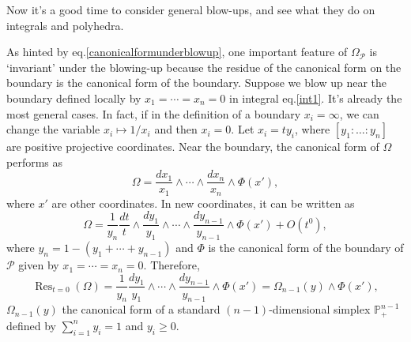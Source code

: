 \documentclass[12pt]{article}
\theoremstyle{definition}
\theoremstyle{plain}
\begin{document}
Now it's a good time to consider general blow-ups, and see what they do on integrals and polyhedra.

As hinted by eq.\eqref{canonicalformunderblowup}, one important feature of $\Omega_{\mathcal P}$
is `invariant' under the blowing-up because the residue of the canonical form on the boundary is
the canonical form of the boundary.
Suppose we blow up near the boundary defined locally by $x_1=\cdots=x_n=0$ in integral eq.\eqref{int1}. 
It's already the most general cases. In fact, if in the definition of a boundary $x_i=\infty$, we can
change the variable $x_i\mapsto 1/x_i$ and then $x_i=0$.
Let $x_i=ty_i$, where $[y_1:\dots:y_n]$ are positive projective coordinates. 
Near the boundary, the canonical form of $\Omega$ performs as 
\[
	\Omega=\frac{dx_1}{x_1}\wedge \cdots\wedge\frac{dx_n}{x_n}
	\wedge \Phi(x'),
\]
where $x'$ are other coordinates. In new coordinates, it can be written as 
\[
	\Omega=\frac{1}{y_n}\frac{dt}{t}\wedge \frac{dy_1}{y_1}\wedge \cdots
	\wedge\frac{dy_{n-1}}{y_{n-1}}\wedge \Phi(x')+O(t^0),
\]
where $y_n=1-(y_1+\cdots+y_{n-1})$ and $\Phi$ is the canonical form of the boundary of $\mathcal P$ given by $x_1=\cdots=x_n=0$. Therefore,
\[
	\operatorname{Res}_{t=0}(\Omega)=\frac{1}{y_n}\frac{dy_1}{y_1}\wedge \cdots\wedge\frac{dy_{n-1}}{y_{n-1}}\wedge \Phi(x')=\Omega_{n-1}(y)\wedge \Phi(x'),
\]
$\Omega_{n-1}(y)$ the canonical form of a standard $(n-1)$-dimensional simplex $\mathbb P^{n-1}_+$ defined by
$
	\sum_{i=1}^n y_i=1
$ and $y_i\geq 0$. 


\end{document}
